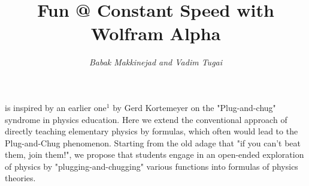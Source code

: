 \documentclass[journal]{IEEEtran}
\begin{document}
%
\title{\Huge Fun @ Constant Speed with Wolfram Alpha}
%
%
%

\author{{\it \LARGE Babak Makkinejad and Vadim Tugai}\IEEEmembership{}
}

\maketitle

%
\IEEEpeerreviewmaketitle


 is inspired by an earlier one$^1$ by Gerd Kortemeyer on the "Plug-and-chug" syndrome in physics education.  Here we extend the conventional approach of directly teaching elementary physics by formulas, which often would lead to the Plug-and-Chug phenomenon.  Starting from the old adage that "if you can't beat them, join them!", we propose that students engage in an open-ended exploration of physics by "plugging-and-chugging" various functions into formulas of physics theories.
\end{document}
